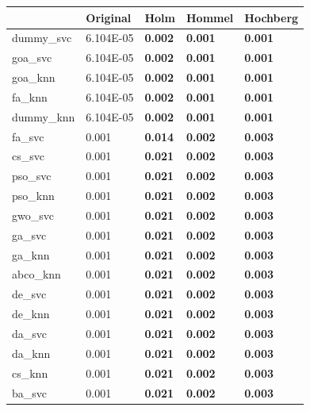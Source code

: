 \begin{table}[htp]
    \centering
    \begin{tabular}{lllll}
        \toprule
        {}         & Original  & Holm           & Hommel         & Hochberg       \\
        \midrule
        dummy\_svc & 6.104E-05 & \textbf{0.002} & \textbf{0.001} & \textbf{0.001} \\
        goa\_svc   & 6.104E-05 & \textbf{0.002} & \textbf{0.001} & \textbf{0.001} \\
        goa\_knn   & 6.104E-05 & \textbf{0.002} & \textbf{0.001} & \textbf{0.001} \\
        fa\_knn    & 6.104E-05 & \textbf{0.002} & \textbf{0.001} & \textbf{0.001} \\
        dummy\_knn & 6.104E-05 & \textbf{0.002} & \textbf{0.001} & \textbf{0.001} \\
        fa\_svc    & 0.001     & \textbf{0.014} & \textbf{0.002} & \textbf{0.003} \\
        cs\_svc    & 0.001     & \textbf{0.021} & \textbf{0.002} & \textbf{0.003} \\
        pso\_svc   & 0.001     & \textbf{0.021} & \textbf{0.002} & \textbf{0.003} \\
        pso\_knn   & 0.001     & \textbf{0.021} & \textbf{0.002} & \textbf{0.003} \\
        gwo\_svc   & 0.001     & \textbf{0.021} & \textbf{0.002} & \textbf{0.003} \\
        ga\_svc    & 0.001     & \textbf{0.021} & \textbf{0.002} & \textbf{0.003} \\
        ga\_knn    & 0.001     & \textbf{0.021} & \textbf{0.002} & \textbf{0.003} \\
        abco\_knn  & 0.001     & \textbf{0.021} & \textbf{0.002} & \textbf{0.003} \\
        de\_svc    & 0.001     & \textbf{0.021} & \textbf{0.002} & \textbf{0.003} \\
        de\_knn    & 0.001     & \textbf{0.021} & \textbf{0.002} & \textbf{0.003} \\
        da\_svc    & 0.001     & \textbf{0.021} & \textbf{0.002} & \textbf{0.003} \\
        da\_knn    & 0.001     & \textbf{0.021} & \textbf{0.002} & \textbf{0.003} \\
        cs\_knn    & 0.001     & \textbf{0.021} & \textbf{0.002} & \textbf{0.003} \\
        ba\_svc    & 0.001     & \textbf{0.021} & \textbf{0.002} & \textbf{0.003} \\

\end{tabular}
\end{table}
